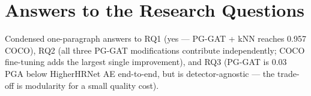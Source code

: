 \section{Answers to the Research Questions}
\label{sec_conc_rq}

Condensed one-paragraph answers to RQ1 (yes --- PG-GAT + kNN reaches 0.957 COCO), RQ2 (all three PG-GAT modifications contribute independently; COCO fine-tuning adds the largest single improvement), and RQ3 (PG-GAT is 0.03 PGA below HigherHRNet AE end-to-end, but is detector-agnostic --- the trade-off is modularity for a small quality cost).
